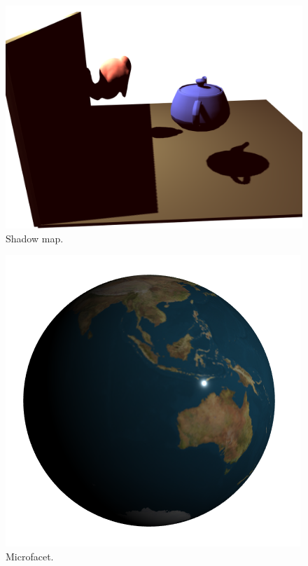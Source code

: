 {\begin{figure}
		\centering
		\includegraphics[width=\linewidth]{fig/shadowmap.png}
		\caption{Shadow map.}
		\label{fig:shadowmap}
\end{figure}
\begin{figure}
		\centering
		\includegraphics[width=\linewidth]{fig/microfacet.png}
		\caption{Microfacet.}
		\label{fig:microfacet}
\end{figure}

}
